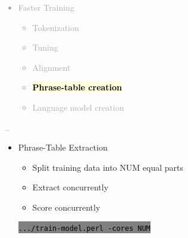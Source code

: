 \documentclass[landscape]{uedslides2C}
\newcommand{\currenttopic}[1]{\colorbox{lightyellow}{\textcolor{black}{\bf #1}}}
\newcommand{\littlecode}[1]{\colorbox{gray}{\textcolor{black}{\small \tt #1}}}
\begin{document}
\vspace{-5mm}
\textcolor{darkgrey}{
\begin{itemize} \itemsep -1mm
\item Faster Training
  \begin{itemize}
  \item Tokenization
  \item Tuning
  \item Alignment
  \item \currenttopic{Phrase-table creation}
  \item Language model creation
  \end{itemize}
\end{itemize}
\ldots
}



\vspace{30mm}
\begin{itemize} \itemsep -1mm

\item {Phrase-Table Extraction}
  \begin{itemize}
  \item Split training data into NUM equal parts
  \item Extract concurrently
  \item Score concurrently
  \end{itemize}
  \begin{center}
    \littlecode{.../train-model.perl -cores NUM}
  \end{center}      
\end{itemize}
\end{document}
